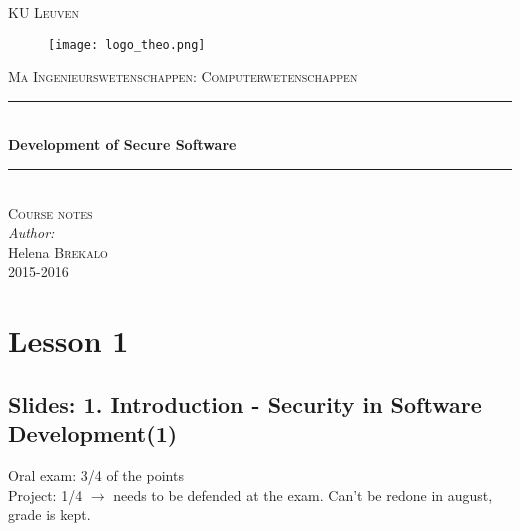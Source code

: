 \documentclass[10pt,a4paper]{report}
\author{Helena Brekalo}
\begin{document}
\begin{titlepage}

\newcommand{\HRule}{\rule{\linewidth}{0.5mm}} %

\center %
 
\textsc{\LARGE KU Leuven}\\[1.5cm] %

\begin{figure}[ht!]
\centering
\texttt{[image: logo\_theo.png]}
\label{kulogo}
\end{figure}

\textsc{\Large Ma Ingenieurswetenschappen: Computerwetenschappen}\\[0.5cm] %


\HRule \\[0.4cm]
{ \huge \bfseries Development of Secure Software}\\[0.4cm]
\HRule \\[1.5cm]


\textsc{\Large Course notes}\\[0.5cm] %


\large \emph{Author:}\\
Helena \textsc{Brekalo}\\[3cm]

{\large 2015-2016}\\[3cm] %

\vfill %

\end{titlepage}

\tableofcontents
\clearpage

\chapter{Lesson 1}

\section{Slides: 1. Introduction - Security in Software Development(1)}

Oral exam: 3/4 of the points\\
Project: 1/4 $\rightarrow$ needs to be defended at the exam. Can't be redone in august, grade is kept.
\end{document}
